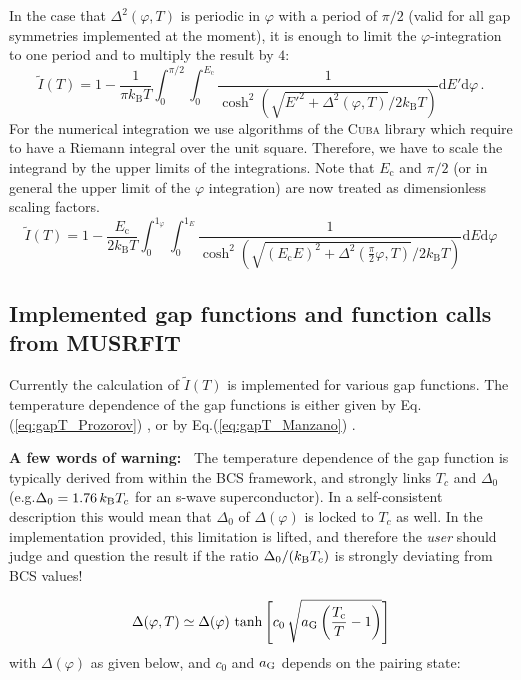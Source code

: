 \documentclass[twoside]{article}
\begin{document}
In the case that $\Delta^2(\varphi,T)$ is periodic in $\varphi$ with a period of $\pi/2$ (valid for all gap symmetries implemented at the moment), it is enough to limit the $\varphi$-integration to one period and to multiply the result by $4$:
\begin{equation}
\tilde{I}(T) = 1 - \frac{1}{\pi k_{\mathrm B}T}\int_0^{\pi/2}\int_{0}^{E_{\mathrm c}}\frac{1}{\cosh^2\left(\sqrt{E'^2+\Delta^2(\varphi,T)}/2k_{\mathrm B}T\right)}\mathrm{d}E'\mathrm{d}\varphi\,.
\end{equation}
For the numerical integration we use algorithms of the \textsc{Cuba} library \cite{cuba} which require to have a Riemann integral over the unit square. Therefore, we have to scale the integrand by the upper limits of the integrations. Note that $E_{\mathrm c}$ and $\pi/2$ (or in general the upper limit of the $\varphi$ integration) are now treated as dimensionless scaling factors.
\begin{equation}
\tilde{I}(T) =  1 - \frac{E_{\mathrm c}}{2k_{\mathrm B}T}\int_0^{1_{\varphi}}\int_{0}^{1_{E}}\frac{1}{\cosh^2\left(\sqrt{(E_{\mathrm c}E)^2+\Delta^2\left(\frac{\pi}{2}\varphi,T\right)}/2k_{\mathrm B}T\right)}\mathrm{d}E\mathrm{d}\varphi
\end{equation}

\subsection*{Implemented gap functions and function calls from MUSRFIT}
Currently the calculation of $\tilde{I}(T)$ is implemented for various gap functions.
The temperature dependence of the gap functions is either given by Eq.(\ref{eq:gapT_Prozorov}) \cite{Prozorov}, or by Eq.(\ref{eq:gapT_Manzano}) \cite{Manzano}.

\vspace{2mm}

\noindent \color{red}\textbf{A few words of warning:~}\color{black} The temperature dependence of the gap function is typically derived from within the BCS framework, 
and strongly links $T_c$ and $\Delta_0$ (e.g.\xspace $\Delta_0 = 1.76\, k_{\rm B} T_c$ for an s-wave superconductor). In a self-consistent 
description this would mean that $\Delta_0$ of $\Delta(\varphi)$ is locked to $T_c$ as well. In the implementation provided, this limitation 
is lifted, and therefore the \emph{user} should judge and question the result if the ratio $\Delta_0/(k_{\rm B}T_c)$ is strongly deviating from
BCS values! 

\begin{equation}\label{eq:gapT_Prozorov}
 \Delta(\varphi,T) \simeq \Delta(\varphi)\,\tanh\left[c_0\,\sqrt{a_{\rm G} \left(\frac{T_{\rm c}}{T}-1\right)}\right]
\end{equation}
\noindent with $\Delta(\varphi)$ as given below, and $c_0$ and $a_{\rm G}$ depends on the pairing state:
\end{document}
